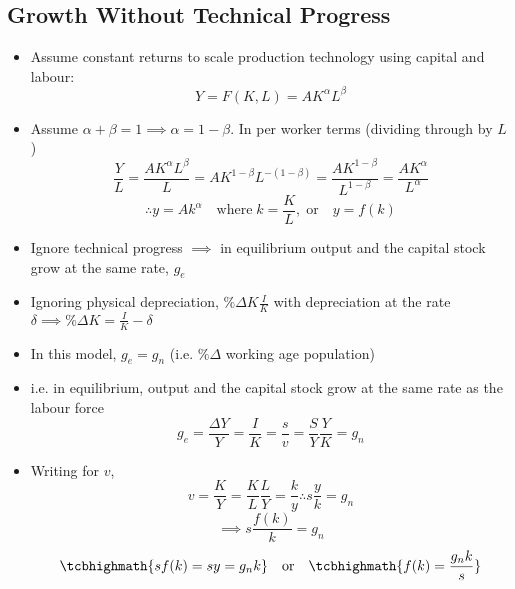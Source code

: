 \documentclass[a4paper,twoside]{article}
\numberwithin{equation}{section}
\numberwithin{figure}{section}
\begin{document}
\subsection{Growth Without Technical Progress}
	\begin{itemize}
		\item Assume constant returns to scale production technology using capital and labour:
		\begin{equation}
			Y = F(K,L) = AK^\alpha L^\beta \label{eq:3.1}
		\end{equation}
		\item Assume \( \alpha + \beta = 1 \implies \alpha = 1 - \beta \). In per worker terms (dividing through by \( L \))
		\begin{equation}
			\frac{Y}{L} = \frac{AK^\alpha L^\beta}{L} = AK^{1-\beta} L^{-(1-\beta)} = \frac{AK^{1-\beta}}{L^{1-\beta}} = \frac{AK^\alpha}{L^\alpha} \label{eq:3.2}
		\end{equation}
		\begin{equation}
			\therefore y = Ak^\alpha \quad\text{where}\; k=\frac{K}{L},\;\text{or}\quad y=f(k) \label{eq:3.3}
		\end{equation}
		\item Ignore technical progress \( \implies \) in equilibrium output and the capital stock grow at the same rate, \( g_e \)
		\item Ignoring physical depreciation, \( \%\Delta K \frac{I}{K} \) with depreciation at the rate \( \delta \implies \% \Delta K = \frac{I}{K} -\delta \)
		\item In this model, \( g_e = g_n \) (i.e. \( \%\Delta \) working age population)
		\item i.e. in equilibrium, output and the capital stock grow at the same rate as the labour force
		\begin{equation}
			g_e = \frac{\Delta Y}{Y} = \frac{I}{K} = \frac{s}{v} = \frac{S}{Y} \frac{Y}{K} = g_n \label{eq:3.4}
		\end{equation}
		\item Writing for \( v \),
		\begin{equation}
			v = \frac{K}{Y} = \frac{K}{L}\frac{L}{Y} = \frac{k}{y} \therefore s \frac{y}{k} = g_n \label{eq:3.5}
		\end{equation}
		\begin{equation}
			\implies s \frac{f(k)}{k} = g_n \label{eq:3.6}
		\end{equation}
		\begin{equation}
			\tcbhighmath{sf(k) = sy = g_n k} \quad\text{or}\quad \tcbhighmath{f(k) = \frac{g_n k}{s}} \label{eq:3.7}

\end{equation}
\end{itemize}
\end{document}
